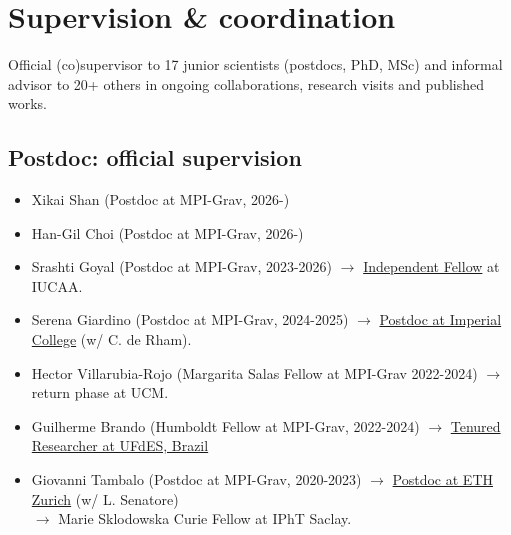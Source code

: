 \documentclass[11pt,a4paper]{article}
\begin{document}
\section*{Supervision \& coordination}
Official (co)supervisor to 17 junior scientists (postdocs, PhD, MSc) and informal advisor to 20+ others in ongoing collaborations, research visits and published works.

\subsection*{Postdoc: official supervision}\setlength{\itemsep}{1pt}
\begin{itemize}\setlength{\itemsep}{1pt}
\item {Xikai Shan} (Postdoc at MPI-Grav, 2026-)
\item {Han-Gil Choi} (Postdoc at MPI-Grav, 2026-)
\item {Srashti Goyal} (Postdoc at MPI-Grav, 2023-2026) $\longrightarrow$ \underline{Independent Fellow} at IUCAA.
\item {Serena Giardino} (Postdoc at MPI-Grav, 2024-2025) %
$\longrightarrow$ \underline{Postdoc at Imperial College} (w/ C. de Rham).
 \item {Hector Villarubia-Rojo} (Margarita Salas Fellow at MPI-Grav 2022-2024) $\longrightarrow$ return phase at UCM.
 \item {Guilherme Brando} (Humboldt Fellow at MPI-Grav, 2022-2024) $\longrightarrow$ \underline{Tenured Researcher at UFdES, Brazil} %
 \item {Giovanni Tambalo} (Postdoc at MPI-Grav, 2020-2023)  $\longrightarrow$ \underline{Postdoc at ETH Zurich} (w/ L. Senatore) \\ $\longrightarrow$ Marie Sklodowska Curie Fellow at IPhT Saclay.
\end{itemize}
\end{document}
